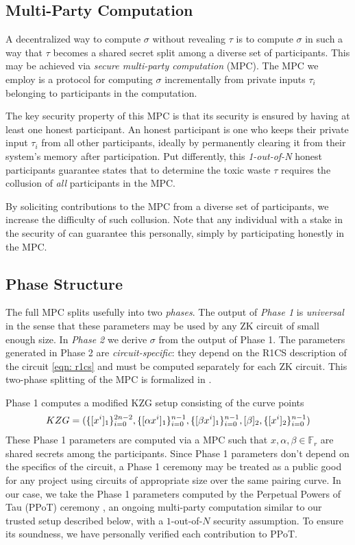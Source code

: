 \subsection{Multi-Party Computation}
A decentralized way to compute $\sigma$ without revealing $\tau$ is to compute $\sigma$ in such a way that $\tau$ becomes a shared secret split among a diverse set of participants. This may be achieved via \emph{secure multi-party computation} (MPC). The MPC we employ is a protocol for computing $\sigma$ incrementally from private inputs $\tau_i$ belonging to participants in the computation. 

The key security property of this MPC is that its security is ensured by having at least one honest participant. An honest participant is one who keeps their private input $\tau_i$ from all other participants, ideally by permanently clearing it from their system's memory after participation. Put differently, this \emph{1-out-of-N} honest participants guarantee states that to determine the toxic waste $\tau$ requires the collusion of \emph{all} participants in the MPC. 

By soliciting contributions to the MPC from a diverse set of participants, we increase the difficulty of such collusion. Note that any individual with a stake in the security of \MantaPay{} can guarantee this personally, simply by participating honestly in the \Setup{} MPC.


\subsection{Phase Structure}

The full \Setup{} MPC splits usefully into two \emph{phases}. The output of \emph{Phase 1} is \emph{universal} in the sense that these parameters may be used by any ZK circuit of small enough size. In \emph{Phase 2} we derive $\sigma$ from the output of Phase 1. The parameters generated in Phase 2 are \emph{circuit-specific}: they depend on the R1CS description of the circuit \eqref{eqn: r1cs} and must be computed separately for each ZK circuit. This two-phase splitting of the MPC is formalized in \cite{bowe19}.

Phase 1 computes a modified KZG setup \cite{KZG} consisting of the curve points 
\begin{align}\label{eq: kzg}
KZG = ( \{ [x^i]_1 \}_{i=0}^{2n-2}, \{ [\alpha x^i]_1 \}_{i=0}^{n-1}, \{ [\beta x^i]_1 \}_{i=0}^{n-1}, [\beta]_2, \{ [x^i]_2 \}_{i=0}^{n-1} ){}
\end{align}
These Phase 1 parameters are computed via a MPC such that $x, \alpha, \beta \in \mathbb{F}_r$ are shared secrets among the participants. Since Phase 1 parameters don't depend on the specifics of the circuit, a Phase 1 ceremony may be treated as a public good for any project using circuits of appropriate size over the same pairing curve. In our case, we take the Phase 1 parameters computed by the Perpetual Powers of Tau (PPoT) ceremony \cite{PPoT}, an ongoing multi-party computation similar to our trusted setup described below, with a $1$-out-of-$N$ security assumption. To ensure its soundness, we have personally verified each contribution to PPoT.
